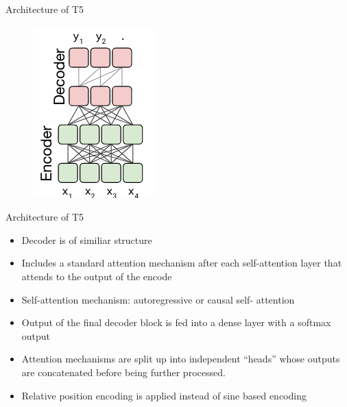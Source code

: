 \documentclass[english]{mlutalk}
\begin{document}
\begin{frame}{Architecture of T5}
    \begin{figure}
        \center
        \includegraphics[scale=0.8]{figures/t5_architecture.png}
    \end{figure}
\end{frame}

\begin{frame}{Architecture of T5}
  \begin{itemize}
    \item Decoder is of similiar structure
    \item Includes a standard attention mechanism after each self-attention layer that attends to the output of the encode
    \item Self-attention mechanism: autoregressive or causal self-
    attention
    \item Output of the final decoder block is fed into a dense layer with a softmax output
    \item Attention mechanisms are split up into
    independent “heads” whose outputs are concatenated before being further processed.
    \item Relative position encoding is applied instead of sine based encoding
  \end{itemize}
\end{frame}
\end{document}
